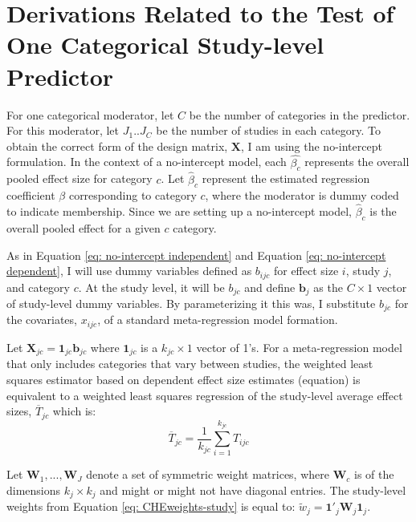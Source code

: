 

\chapter{Derivations Related to the Test of One Categorical Study-level Predictor} \label{App: onecat}
 






For one categorical moderator, let $C$ be the number of categories in the predictor. For this moderator, let $J_1..J_C$ be the number of studies in each category. To obtain the correct form of the design matrix, $\mathbf{X}$, I am using the no-intercept formulation. In the context of a no-intercept model, each $\hat{\beta_c}$ represents the overall pooled effect size for category $c$. Let $\hat{\beta}_c$ represent the estimated regression coefficient $\beta$ corresponding to category $c$, where the moderator is dummy coded to indicate membership. Since we are setting up a no-intercept model, $\hat{\beta}_c$ is the overall pooled effect for a given $c$ category. 


 As in Equation \ref{eq: no-intercept independent} and Equation \ref{eq: no-intercept dependent}, I will use dummy variables defined as $b_{ijc}$ for effect size $i$, study $j$, and category $c$. At the study level, it will be $b_{jc}$ and define $\mathbf{b}_{j}$ as the $C \times 1$ vector of study-level dummy variables. By parameterizing it this was, I substitute $ b_{jc}$ for the covariates, $x_{ijc}$, of a standard meta-regression model formation. 
 
 Let $\mathbf{X}_{jc} = \mathbf{1}_{jc}\mathbf{b}_{jc}$ where $\mathbf{1}_{jc}$ is a $k_{jc} \times 1$ vector of 1’s. For a meta-regression model that only includes categories that vary between studies, the weighted least squares estimator based on dependent effect size estimates (equation) is equivalent to a weighted least squares regression of the study-level average effect sizes, $\overline{T}_{jc}$ which is: 
\begin{equation}
     \overline{T}_{jc} = \frac{1}{k_{jc}}\sum_{i=1}^{k_{jc}}T_{ijc}
\end{equation}
 
Let $\mathbf{W}_{1}, ..., \mathbf{W}_{J} $ denote a set of symmetric weight matrices, where $\mathbf{W}_{c}$ is of the dimensions $k_{j} \times k_{j}$ and might or might not have diagonal entries. The study-level weights from Equation \ref{eq: CHEweights-study} is equal to: $\tilde{w}_{j} = \mathbf{1}'_{j}\mathbf{W}_{j}\mathbf{1}_{j}$. 

